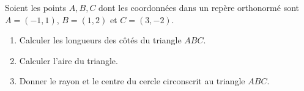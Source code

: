 
\begin{exercice}\label{exoSeconde-0020}

    Soient%
    les points \( A,B,C\) dont les coordonnées dans un repère orthonormé sont \( A=(-1,1)\), \( B=(1,2)\) et \( C=(3,-2)\).
    \begin{enumerate}
        \item
            Calculer les longueurs des côtés du triangle \( ABC\).
        \item
            Calculer l'aire du triangle.
        \item
            Donner le rayon et le centre du cercle circonscrit au triangle \( ABC\).
    \end{enumerate}

\end{exercice}
